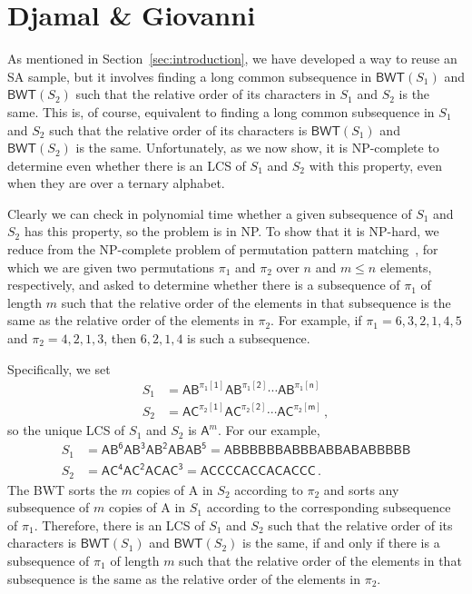 \documentclass{llncs}
\newcommand{\BWT}
  {\ensuremath{\mathsf{BWT}}}
\begin{document}
\section{Djamal \& Giovanni}
\label{sec:djamal&giovanni}

As mentioned in Section~\ref{sec:introduction}, we have developed a way to reuse an SA sample, but it involves finding a long common subsequence in \(\BWT (S_1)\) and \(\BWT (S_2)\) such that the relative order of its characters in $S_1$ and $S_2$ is the same.  This is, of course, equivalent to finding a long common subsequence in $S_1$ and $S_2$ such that the relative order of its characters is \(\BWT (S_1)\) and \(\BWT (S_2)\) is the same.  Unfortunately, as we now show, it is NP-complete to determine even whether there is an LCS of $S_1$ and $S_2$ with this property, even when they are over a ternary alphabet.

Clearly we can check in polynomial time whether a given subsequence of $S_1$ and $S_2$ has this property, so the problem is in NP.  To show that it is NP-hard, we reduce from the NP-complete problem of permutation pattern matching~\cite{BBL98}, for which we are given two permutations $\pi_1$ and $\pi_2$ over $n$ and \(m \leq n\) elements, respectively, and asked to determine whether there is a subsequence of $\pi_1$ of length $m$ such that the relative order of the elements in that subsequence is the same as the relative order of the elements in $\pi_2$.  For example, if \(\pi_1 = 6, 3, 2, 1, 4, 5\) and \(\pi_2 = 4, 2, 1, 3\), then \(6, 2, 1, 4\) is such a subsequence.  

Specifically, we set
\begin{align*}
S_1 & = \mathsf{A B^{\pi_1 [1]} A B^{\pi_1 [2]} \cdots A B^{\pi_1 [n]}}\\
S_2 & = \mathsf{A C^{\pi_2 [1]} A C^{\pi_2 [2]} \cdots A C^{\pi_2 [m]}}\,,
\end{align*}
so the unique LCS of $S_1$ and $S_2$ is $\mathsf{A}^m$.  For our example,
\begin{align*}
S_1 & = \mathsf{A B^6 A B^3 A B^2 A B A B^5} = \mathsf{A B B B B B B A B B B A B B A B A B B B B B}\\
S_2 & = \mathsf{A C^4 A C^2 A C A C^3} = \mathsf{A C C C C A C C A C A C C C}\,.
\end{align*}
The BWT sorts the $m$ copies of {\sf A} in $S_2$ according to $\pi_2$ and sorts any subsequence of $m$ copies of {\sf A} in $S_1$ according to the corresponding subsequence of $\pi_1$.  Therefore, there is an LCS of $S_1$ and $S_2$ such that the relative order of its characters is \(\BWT (S_1)\) and \(\BWT (S_2)\) is the same, if and only if there is a subsequence of $\pi_1$ of length $m$ such that the relative order of the elements in that subsequence is the same as the relative order of the elements in $\pi_2$.
\end{document}

